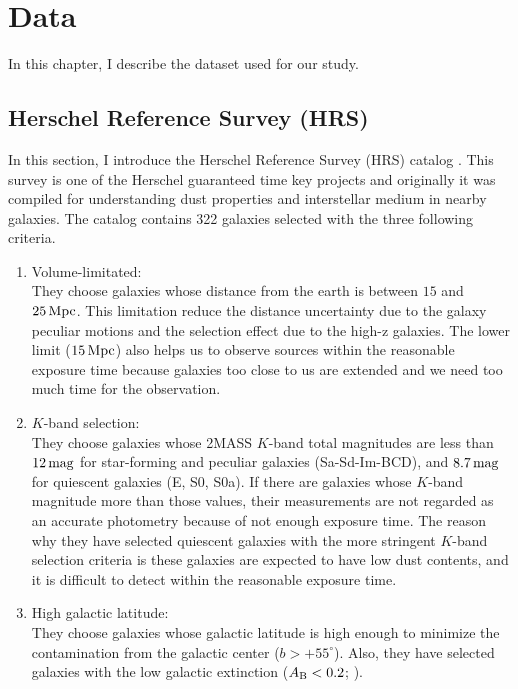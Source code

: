 \chapter{Data}\label{chap:data}
\begin{chapabstract}

In this chapter, I describe the dataset used for our study.



\end{chapabstract}

\section{Herschel Reference Survey (HRS)}\label{sec:HerschelReferenceSurvey}
In this section, I introduce the Herschel Reference Survey (HRS) catalog \citep{Boselli2010}.
This survey is one of the Herschel guaranteed time key projects and originally it was compiled for understanding dust properties and interstellar medium in nearby galaxies.
The catalog contains 322 galaxies selected with the three following criteria.

\begin{enumerate}
    \item Volume-limitated:\\
        They choose galaxies whose distance from the earth is between $15$ and $25\,\mathrm{Mpc}$.
        This limitation reduce the distance uncertainty due to the galaxy peculiar motions and the selection effect due to the high-z galaxies.
        The lower limit ($15\,\mathrm{Mpc}$) also helps us to observe sources within the reasonable exposure time because galaxies too close to us are extended and we need too much time for the observation.
    \item $K$-band selection:\\
        They choose galaxies whose 2MASS $K$-band total magnitudes are less than $12\,\mathrm{mag}$ for star-forming and peculiar galaxies (Sa-Sd-Im-BCD), and $8.7\,\mathrm{mag}$ for quiescent galaxies (E, S0, S0a).
        If there are galaxies whose $K$-band magnitude more than those values, their measurements are not regarded as an accurate photometry because of not enough exposure time.
        The reason why they have selected quiescent galaxies with the more stringent $K$-band selection criteria is these galaxies are expected to have low dust contents, and it is difficult to detect within the reasonable exposure time.
    \item High galactic latitude:\\
        They choose galaxies whose galactic latitude is high enough to minimize the contamination from the galactic center ($b > +55^{\circ}$).
        Also, they have selected galaxies with the low galactic extinction ($A_{\mathrm{B}} < 0.2$; \citealt{Schlegel1998}).
\end{enumerate}

